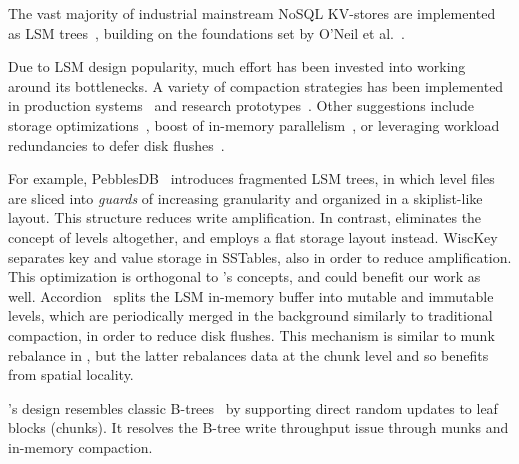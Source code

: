 

The vast majority of industrial mainstream NoSQL KV-stores are  implemented as LSM trees~\cite{hbase, 
RocksDB, scylladb, Bigtable2008, cassandra2010}, building on the foundations set by O'Neil 
et al.~\cite{O'Neil1996, Muth1998}. 

Due to LSM design popularity, much effort has been invested into working around its bottlenecks.
A variety of compaction strategies has been implemented in production systems~\cite{CallaghanCompaction, 
ScyllaCompaction} and research prototypes~\cite{triad, PebblesDB}. Other suggestions include storage
optimizations~\cite{WiscKey, PebblesDB}, boost of in-memory parallelism~\cite{scylladb, clsm2015}, or leveraging 
 workload redundancies to defer disk flushes~\cite{triad, accordion}. 

For example, PebblesDB~\cite{PebblesDB} introduces fragmented LSM trees, in which level files are 
sliced into {\em guards\/} of increasing granularity and organized in a skiplist-like layout. This structure 
reduces write amplification. In contrast, \sys\/ eliminates the concept of levels altogether, 
and employs a flat storage layout instead. WiscKey~\cite{WiscKey} separates key and value storage 
in SSTables, also in order to reduce amplification. This optimization is orthogonal to \sys's concepts,
and could benefit our work as well. Accordion~\cite{accordion} splits the LSM in-memory buffer into mutable 
and immutable levels, which are periodically merged in the background similarly to traditional compaction, 
in order to reduce disk flushes. This mechanism is similar to munk rebalance in \sys, 
but the latter rebalances data at the chunk level and so benefits from spatial locality.

\sys's design resembles classic B-trees~\cite{Knuth:1998:ACP:280635} by supporting direct random updates to leaf blocks (chunks). 
It resolves the B-tree write throughput issue through munks and in-memory compaction. {}


